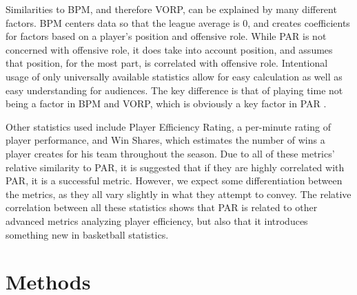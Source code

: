 \documentclass[12pt]{article}
\begin{document}
Similarities to BPM, and therefore VORP, can be explained by many 
different factors. BPM centers data so that the league average is 0, and 
creates coefficients for factors based on a player's position and offensive 
role. While PAR is not concerned with offensive role, it does take into 
account position, and assumes that position, for the most part, is 
correlated with offensive role. Intentional usage of only universally 
available statistics allow for easy calculation as well as easy 
understanding for audiences. The key difference is that of playing time not 
being a factor in BPM and VORP, which is obviously a key factor in PAR 
\citep{BasketballReferenceBPM}.

Other statistics used include Player Efficiency Rating, a 
per-minute rating of player performance, and Win Shares, which 
estimates the number of wins a player creates 
for his team throughout the season. Due to all of these metrics' relative 
similarity to PAR, it is suggested 
that if they are highly correlated with PAR, it is a successful metric. 
However, we expect some differentiation 
between the metrics, as they all vary slightly in what they attempt to 
convey. The relative correlation 
between all these statistics shows that PAR is related to other advanced 
metrics analyzing player efficiency, 
but also that it introduces something new in basketball statistics.



\section{Methods}
\end{document}
